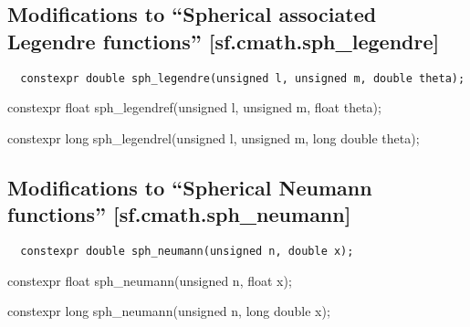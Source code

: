 \documentclass[prd,twocolumn,amsmath,amssymb,nofootinbib,eqsecnum]{revtex4-1}
\newcommand{\code}[1]{{\tt #1}}
\newcommand{\highlight}[1]{{\color{red} #1}}
\newcommand{\bigund}{{\Huge{\_}}}
\begin{document}
\subsection{Modifications to  ``Spherical associated Legendre functions''  [sf.cmath.sph{\bigund}legendre]}

\code{
	\highlight{constexpr} double sph\_legendre(unsigned l, unsigned m, double theta);
	
	\highlight{constexpr} float sph\_legendref(unsigned l, unsigned m, float theta);
	
	\highlight{constexpr} long sph\_legendrel(unsigned l, unsigned m, long double theta);

}

\subsection{Modifications to  ``Spherical Neumann functions''  [sf.cmath.sph{\bigund}neumann]}

\code{
	\highlight{constexpr} double sph\_neumann(unsigned n, double x);
	
	\highlight{constexpr} float sph\_neumann(unsigned n, float x);
	
	\highlight{constexpr} long sph\_neumann(unsigned n, long double x);

}
\end{document}
